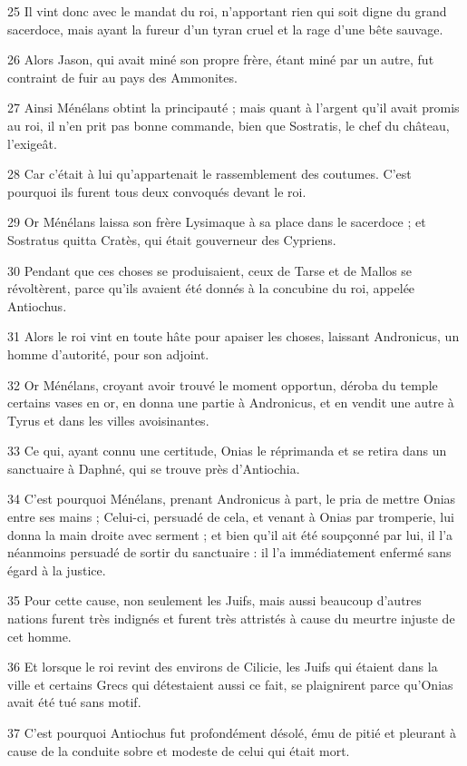 \par 25 Il vint donc avec le mandat du roi, n'apportant rien qui soit digne du grand sacerdoce, mais ayant la fureur d'un tyran cruel et la rage d'une bête sauvage.
\par 26 Alors Jason, qui avait miné son propre frère, étant miné par un autre, fut contraint de fuir au pays des Ammonites.
\par 27 Ainsi Ménélans obtint la principauté ; mais quant à l'argent qu'il avait promis au roi, il n'en prit pas bonne commande, bien que Sostratis, le chef du château, l'exigeât.
\par 28 Car c'était à lui qu'appartenait le rassemblement des coutumes. C'est pourquoi ils furent tous deux convoqués devant le roi.
\par 29 Or Ménélans laissa son frère Lysimaque à sa place dans le sacerdoce ; et Sostratus quitta Cratès, qui était gouverneur des Cypriens.
\par 30 Pendant que ces choses se produisaient, ceux de Tarse et de Mallos se révoltèrent, parce qu'ils avaient été donnés à la concubine du roi, appelée Antiochus.
\par 31 Alors le roi vint en toute hâte pour apaiser les choses, laissant Andronicus, un homme d'autorité, pour son adjoint.
\par 32 Or Ménélans, croyant avoir trouvé le moment opportun, déroba du temple certains vases en or, en donna une partie à Andronicus, et en vendit une autre à Tyrus et dans les villes avoisinantes.
\par 33 Ce qui, ayant connu une certitude, Onias le réprimanda et se retira dans un sanctuaire à Daphné, qui se trouve près d'Antiochia.
\par 34 C'est pourquoi Ménélans, prenant Andronicus à part, le pria de mettre Onias entre ses mains ; Celui-ci, persuadé de cela, et venant à Onias par tromperie, lui donna la main droite avec serment ; et bien qu'il ait été soupçonné par lui, il l'a néanmoins persuadé de sortir du sanctuaire : il l'a immédiatement enfermé sans égard à la justice.
\par 35 Pour cette cause, non seulement les Juifs, mais aussi beaucoup d'autres nations furent très indignés et furent très attristés à cause du meurtre injuste de cet homme.
\par 36 Et lorsque le roi revint des environs de Cilicie, les Juifs qui étaient dans la ville et certains Grecs qui détestaient aussi ce fait, se plaignirent parce qu'Onias avait été tué sans motif.
\par 37 C'est pourquoi Antiochus fut profondément désolé, ému de pitié et pleurant à cause de la conduite sobre et modeste de celui qui était mort.

